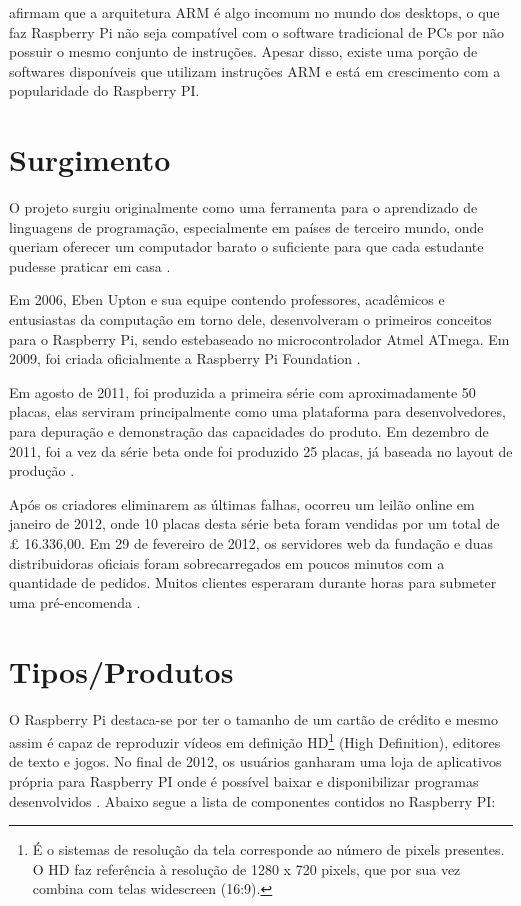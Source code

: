 \documentclass[
	12pt,				%
	openright,			%
	twoside,			%
	a4paper,			%
	chapter=TITLE,		%
	english,			%
	brazil				%
	]{abntex2}
\begin{document}
 afirmam que a arquitetura ARM é algo incomum no mundo dos desktops, o que faz Raspberry Pi não seja compatível com o software tradicional de PCs por não possuir o mesmo conjunto de instruções. Apesar disso, existe uma porção de softwares disponíveis que utilizam instruções ARM e está em crescimento com a popularidade do Raspberry PI.


\section{Surgimento}

O projeto surgiu originalmente como uma ferramenta para o aprendizado de linguagens de programação, especialmente em países de terceiro mundo, onde queriam oferecer um computador barato o suficiente para que cada estudante pudesse praticar em casa \cite{ClubeHardware}.

Em 2006, Eben Upton e sua equipe contendo professores, acadêmicos e entusiastas da computação em torno dele, desenvolveram o primeiros conceitos para o Raspberry Pi, sendo estebaseado no microcontrolador Atmel ATmega. Em 2009, foi criada oficialmente a Raspberry Pi Foundation \cite{eben2013raspberry}. 

Em agosto de 2011, foi produzida a primeira série com aproximadamente 50 placas, elas serviram principalmente como uma plataforma para desenvolvedores, para depuração e demonstração das capacidades do produto. Em dezembro de 2011, foi a vez da série beta onde foi produzido 25 placas, já baseada no layout de produção \cite{Werner.Raspberry}.

Após os criadores eliminarem as últimas falhas, ocorreu um leilão online em janeiro de 2012, onde 10 placas desta série beta foram vendidas por um total de £ 16.336,00. Em 29 de fevereiro de 2012, os servidores web da fundação e duas distribuidoras oficiais foram sobrecarregados em poucos minutos com a quantidade de pedidos. Muitos clientes esperaram durante horas para submeter uma pré-encomenda \cite{Werner.Raspberry}.


\section{Tipos/Produtos}


O Raspberry Pi destaca-se por ter o tamanho de um cartão de crédito e mesmo assim é capaz de reproduzir vídeos em definição HD\footnote{É o sistemas de resolução da tela corresponde ao número de pixels presentes. O HD faz referência à resolução de 1280 x 720 pixels, que por sua vez combina com telas widescreen (16:9).} (High Definition), editores de texto e jogos. No final de 2012, os usuários ganharam uma loja de aplicativos própria para Raspberry PI onde é possível baixar e disponibilizar programas desenvolvidos \cite{revistagalileu}. Abaixo segue a lista de componentes contidos no Raspberry PI:
\end{document}
